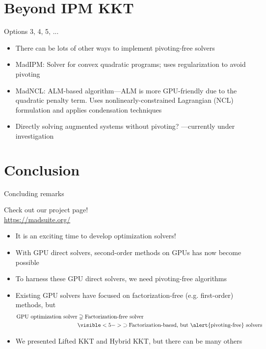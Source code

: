 \documentclass[aspectratio=169,11pt]{beamer}
\begin{document}
\section{Beyond IPM KKT}
\begin{frame}{Options 3, 4, 5, ...}
  \begin{itemize}
  \item There can be lots of other ways to implement pivoting-free solvers
  \item<2-> \alert{MadIPM}: Solver for convex quadratic programs; uses regularization to avoid pivoting \citep{montoisonGPUImplementationSecondOrder2025}
  \item<3-> \alert{MadNCL}: ALM-based algorithm---ALM is more \alert{GPU-friendly} due to the quadratic penalty term. Uses nonlinearly-constrained Lagrangian (NCL) formulation and applies condensation techniques \citep{montoisonMadNCLGPUImplementation2025}
  \item<4-> Directly solving augmented systems without pivoting? ---currently under investigation
  \end{itemize}
\end{frame}

\section{Conclusion}
\begin{frame}{Concluding remarks}
  \begin{center}
    Check out our project page!\\
    \url{https://madsuite.org/}
  \end{center}
  \begin{itemize}
  \item It is an exciting time to develop optimization solvers!
  \item<2-> With \alert{GPU direct solvers}, \alert{second-order methods} on GPUs has now become possible
  \item<3-> To harness these GPU direct solvers, we need \alert{pivoting-free algorithms}
  \item<4-> Existing GPU solvers have focused on \alert{factorization-free} (e.g. first-order) methods, but
      \begin{align*}
        \text{GPU optimization solver}
        &\supsetneq \text{Factorization-free solver}\\
        &\visible<5->{\supset\text{Factorization-baesd, but \alert{pivoting-free} solvers}}
      \end{align*}
  \item<6-> We presented \alert{Lifted KKT} and \alert{Hybrid KKT}, but there can be many others
  \end{itemize}
\end{frame}
\end{document}
